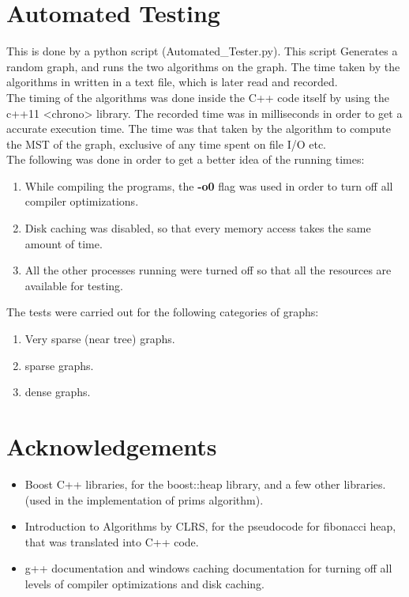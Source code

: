 \documentclass[]{article}
\begin{document}
\section{Automated Testing}
\begin{flushleft}
	This is done by a python script (Automated\_Tester.py).
	This script Generates a random graph, and runs the two algorithms on the graph. The time taken by the algorithms in written in a text file, which is later read and recorded.\\
	\vspace{10px}
	The timing of the algorithms was done inside the C++ code itself by using the c++11 <chrono> library. The recorded time was in milliseconds in order to get a accurate execution time. The time was that taken by the algorithm to compute the MST of the graph, exclusive of any time spent on file I/O etc.\\
	\vspace{10px}
	The following was done in order to get a better idea of the running times:
	\begin{enumerate}
	\item While compiling the programs, the \textbf{-o0} flag was used in order to turn off all compiler optimizations. 
	\item Disk caching was disabled, so that every memory access takes the same amount of time. 
	\item All the other processes running were turned off so that all the resources are available for testing.
	\end{enumerate}
	
	The tests were carried out for the following categories of graphs:
	\begin{enumerate}	
	\item Very sparse (near tree) graphs.
	 \item sparse graphs.
	 \item dense graphs.
	\end{enumerate}
	
	
\end{flushleft}

\section{Acknowledgements}
\begin{flushleft}
\begin{itemize}
\item Boost C++ libraries, for the boost::heap library, and a few other libraries. (used in the implementation of prims algorithm).
\item Introduction to Algorithms by CLRS, for the pseudocode for fibonacci heap, that was translated into C++ code. 
\item g++ documentation and windows caching documentation for turning off all levels of compiler optimizations and disk caching.
\end{itemize}
\end{flushleft}
\end{document}
